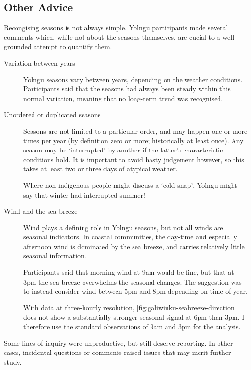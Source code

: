 \subsection{Other Advice}
\label{subsec:detection-advice}

Recongising seasons is not always simple.  Yolngu participants made
several comments which, while not about the seasons themselves, are
cucial to a well-grounded attempt to quantify them.

\begin{description}
\item[Variation between years]
    Yolngu seasons vary between years, depending on the weather conditions.
    Participants said that the seasons had always been steady within this
    normal variation, meaning that no long-term trend was recognised.

\item[Unordered or duplicated seasons]
    Seasons are not limited to a particular order, and may happen one or more
    times per year (by definition zero or more; historically at least once).
    Any season may be `interrupted' by another if the latter's characteristic
    conditions hold.  It is important to avoid hasty judgement however, so this
    takes at least two or three days of atypical weather.

    Where non-indigenous people might discuss a `cold snap', Yolngu might
    say that winter had interrupted summer!

\item[Wind and the sea breeze]
    Wind plays a defining role in Yolngu seasons, but not all winds are
    seasonal indicators.  In coastal communities, the day-time and especially
    afternoon wind is dominated by the sea breeze, and carries relatively little
    seasonal information.

    Participants said that morning wind at 9am would be fine, but that at
    3pm the sea breeze overwhelms the seasonal changes.  The suggestion was
    to instead consider wind between 5pm and 8pm depending on time of year.

    With data at three-hourly resolution, \cref{fig:galiwinku-seabreeze-direction}
    does not show a substantially stronger seasonal signal at 6pm than 3pm.
    I therefore use the standard observations of 9am and 3pm for the analysis.
\end{description}

Some lines of inquiry were unproductive, but still deserve reporting.
In other cases, incidental questions or comments raised issues that may
merit further study.

